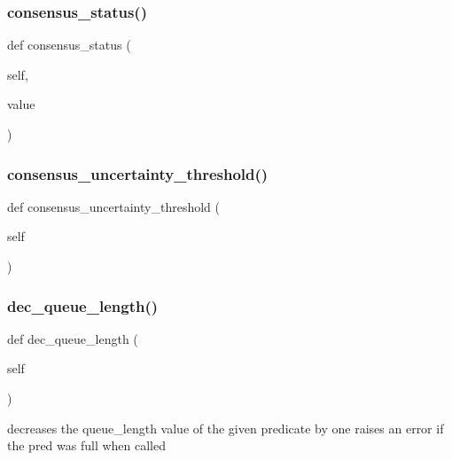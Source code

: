 \subsubsection{\texorpdfstring{consensus\_status()}{consensus\_status()}\hspace{0.1cm}{\footnotesize\ttfamily [2/2]}}
{\footnotesize\ttfamily def consensus\+\_\+status (\begin{DoxyParamCaption}\item[{}]{self,  }\item[{}]{value }\end{DoxyParamCaption})}

\mbox{\label{classdynamicfilterapp_1_1models_1_1_predicate_abb47f59cdc395b26b76297491b95d603}} 
\subsubsection{\texorpdfstring{consensus\_uncertainty\_threshold()}{consensus\_uncertainty\_threshold()}}
{\footnotesize\ttfamily def consensus\+\_\+uncertainty\+\_\+threshold (\begin{DoxyParamCaption}\item[{}]{self }\end{DoxyParamCaption})}

\mbox{\label{classdynamicfilterapp_1_1models_1_1_predicate_adf2c6e37d925945ace447e024b31b87e}} 
\subsubsection{\texorpdfstring{dec\_queue\_length()}{dec\_queue\_length()}}
{\footnotesize\ttfamily def dec\+\_\+queue\+\_\+length (\begin{DoxyParamCaption}\item[{}]{self }\end{DoxyParamCaption})}

\begin{DoxyVerb}decreases the queue_length value of the given predicate by one
raises an error if the pred was full when called
\end{DoxyVerb}
 \mbox{\label{classdynamicfilterapp_1_1models_1_1_predicate_a2222560950a1e6f6b3a67c30d802c16e}} 
